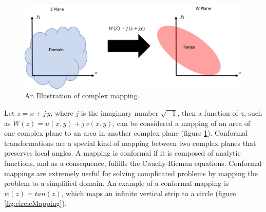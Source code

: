   \begin{figure}[h]
  \centering
  \includegraphics[width=\textwidth]{images/mapping.png}
  \caption[Illustration of complex mapping.]{An Illustration of complex mapping.}
  \label{fig:mapping}
  \end{figure}
  
  \par Let $z = x + j\,y$, where $j$ is the imaginary number $\sqrt{-1}$, then a function of $z$, such as $W(z) = u(x,y) + j\,v(x,y)$, can be considered a mapping of an area of one complex plane to an area in another complex plane (figure \ref{fig:mapping}). Conformal transformations are a special kind of mapping between two complex planes that preserves local angles. A mapping is conformal if it is composed of analytic functions, and as a consequence, fulfills the Cauchy-Rieman equations. Conformal mappings are extremely useful for solving complicated problems by mapping the problem to a simplified domain. An example of a conformal mapping is $w(z) = tan(z)$, which maps an infinite vertical strip to a circle (figure \ref{fig:circleMapping}). 

